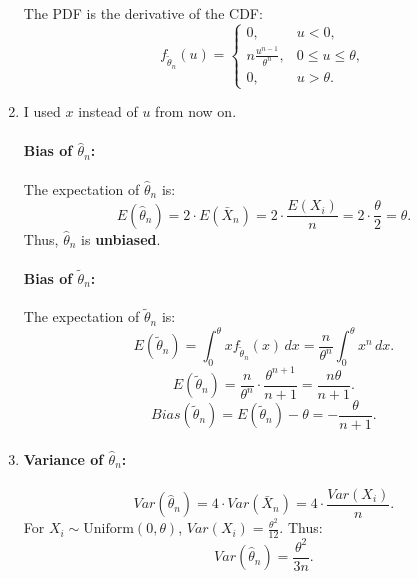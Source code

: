 \documentclass[12pt,letterpaper, onecolumn]{exam}
\begin{document}
\begin{questions}
\begin{solution}
\begin{enumerate}
            The PDF is the derivative of the CDF:
            \[
            f_{\tilde{\theta}_n}(u) =
            \begin{cases}
            0, & u < 0, \\
            n \frac{u^{n-1}}{\theta^n}, & 0 \leq u \leq \theta, \\
            0, & u > \theta.
            \end{cases}
            \]
        \item I used $x$ instead of $u$ from now on.
        \paragraph{Bias of \(\hat{\theta}_n\):}
            The expectation of \(\hat{\theta}_n\) is:
            \[
            E(\hat{\theta}_n) = 2 \cdot E(\bar{X}_n) = 2 \cdot \frac{E(X_i)}{n} = 2 \cdot \frac{\theta}{2} = \theta.
            \]
            Thus, \(\hat{\theta}_n\) is \textbf{unbiased}.

            \paragraph{         Bias of \(\tilde{\theta}_n\):}
                        The expectation of \(\tilde{\theta}_n\) is:
            \[
            E(\tilde{\theta}_n) = \int_0^\theta x f_{\tilde{\theta}_n}(x) \, dx = \frac{n}{\theta^n} \int_0^\theta x^n \, dx.
            \]
            \[
            E(\tilde{\theta}_n) = \frac{n}{\theta^n} \cdot \frac{\theta^{n+1}}{n+1} = \frac{n \theta}{n+1}.
            \]
            \[
            Bias(\tilde{\theta}_n) = E(\tilde{\theta}_n) - \theta = -\frac{\theta}{n+1}.
            \]
        \item \paragraph{Variance of \(\hat{\theta}_n\):}
            \[
            Var(\hat{\theta}_n) = 4 \cdot Var(\bar{X}_n) = 4 \cdot \frac{Var(X_i)}{n}.
            \]
                    For \(X_i \sim \text{Uniform}(0, \theta)\), \(Var(X_i) = \frac{\theta^2}{12}\). Thus:
            \[
            Var(\hat{\theta}_n) = \frac{\theta^2}{3n}.
            \]
            

\end{enumerate}
\end{solution}
\end{questions}
\end{document}
